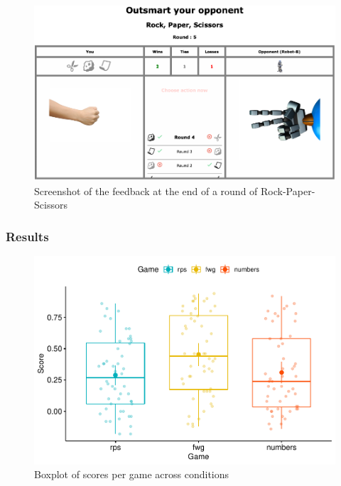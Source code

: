 \documentclass[man,floatsintext]{apa6}
\begin{document}
\begin{figure}

{\centering \includegraphics{images/feedback_rps} 

}

\caption{Screenshot of the feedback at the end of a round of Rock-Paper-Scissors}\label{fig:feedback-rps-exp2}
\end{figure}

\hypertarget{results}{%
\subsubsection{Results}\label{results}}

\begin{figure}

{\centering \includegraphics{draft_upgrade_v1_files/figure-latex/exp1-avg-scores-game-1} 

}

\caption{Boxplot of scores per game across conditions}\label{fig:exp1-avg-scores-game}
\end{figure}
\end{document}
